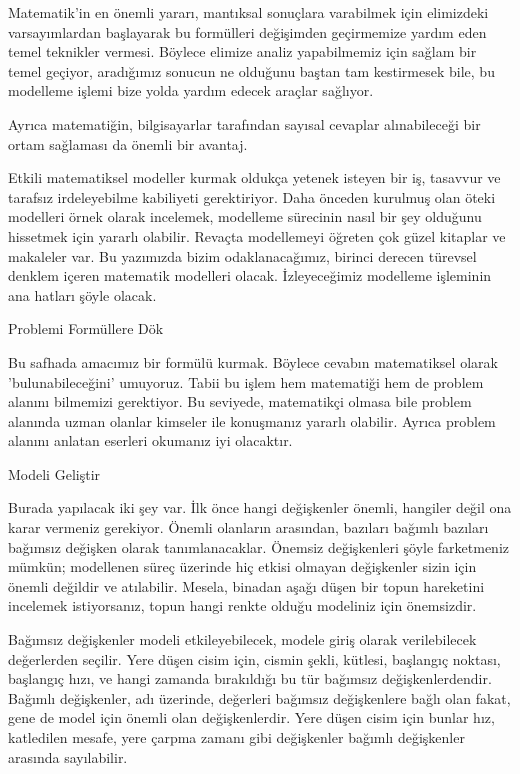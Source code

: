\documentclass[12pt,fleqn]{article}\usepackage{../../common}
\begin{document}
Matematik'in en önemli yararı, mantıksal sonuçlara varabilmek için
elimizdeki varsayımlardan başlayarak bu formülleri değişimden geçirmemize
yardım eden temel teknikler vermesi. Böylece elimize analiz yapabilmemiz
için sağlam bir temel geçiyor, aradığımız sonucun ne olduğunu baştan tam
kestirmesek bile, bu modelleme işlemi bize yolda yardım edecek araçlar
sağlıyor.

Ayrıca matematiğin, bilgisayarlar tarafından sayısal cevaplar alınabileceği
bir ortam sağlaması da önemli bir avantaj.

Etkili matematiksel modeller kurmak oldukça yetenek isteyen bir iş,
tasavvur ve tarafsız irdeleyebilme kabiliyeti gerektiriyor. Daha önceden
kurulmuş olan öteki modelleri örnek olarak incelemek, modelleme sürecinin
nasıl bir şey olduğunu hissetmek için yararlı olabilir. Revaçta modellemeyi
öğreten çok güzel kitaplar ve makaleler var. Bu yazımızda bizim
odaklanacağımız, birinci derecen türevsel denklem içeren matematik
modelleri olacak. İzleyeceğimiz modelleme işleminin ana hatları şöyle
olacak.


Problemi Formüllere Dök

Bu safhada amacımız bir formülü kurmak. Böylece cevabın matematiksel olarak
'bulunabileceğini' umuyoruz. Tabii bu işlem hem matematiği hem de problem
alanını bilmemizi gerektiyor. Bu seviyede, matematikçi olmasa bile problem
alanında uzman olanlar kimseler ile konuşmanız yararlı olabilir. Ayrıca
problem alanını anlatan eserleri okumanız iyi olacaktır.

Modeli Geliştir

Burada yapılacak iki şey var. İlk önce hangi değişkenler önemli, hangiler
değil ona karar vermeniz gerekiyor. Önemli olanların arasından, bazıları
bağımlı bazıları bağımsız değişken olarak tanımlanacaklar. Önemsiz
değişkenleri şöyle farketmeniz mümkün; modellenen süreç üzerinde hiç etkisi
olmayan değişkenler sizin için önemli değildir ve atılabilir. Mesela,
binadan aşağı düşen bir topun hareketini incelemek istiyorsanız, topun
hangi renkte olduğu modeliniz için önemsizdir.

Bağımsız değişkenler modeli etkileyebilecek, modele giriş olarak
verilebilecek değerlerden seçilir. Yere düşen cisim için, cismin şekli,
kütlesi, başlangıç noktası, başlangıç hızı, ve hangi zamanda bırakıldığı bu
tür bağımsız değişkenlerdendir. Bağımlı değişkenler, adı üzerinde,
değerleri bağımsız değişkenlere bağlı olan fakat, gene de model için önemli
olan değişkenlerdir. Yere düşen cisim için bunlar hız, katledilen mesafe,
yere çarpma zamanı gibi değişkenler bağımlı değişkenler arasında
sayılabilir.
\end{document}
